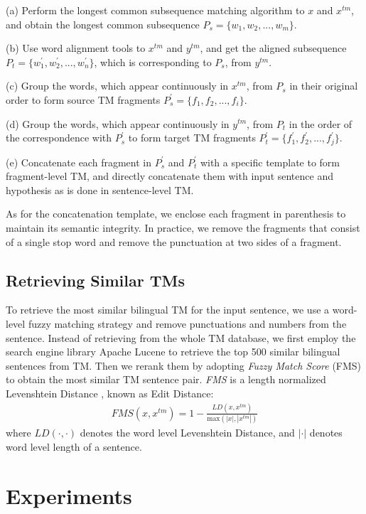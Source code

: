 \documentclass[letterpaper]{article} %
\begin{document}
(a) Perform the longest common subsequence matching algorithm to $x$ and $x^{tm}$, and obtain the longest common subsequence $P_s = \{w_1,w_2,...,w_m\}$.

(b) Use word alignment tools to $x^{tm}$ and $y^{tm}$, and get the aligned subsequence $P_t = \{w^\prime_1,w^\prime_2,...,w^\prime_n\}$, which is corresponding to $P_s$, from $y^{tm}$.

(c) Group the words, which appear continuously in $x^{tm}$, from $P_s$ in their original order to form source TM fragments $P^\prime_s = \{f_1,f_2,...,f_i\}$.

(d) Group the words, which appear continuously in $y^{tm}$, from $P_t$ in the order of the correspondence with $P^\prime_s$ to form target TM fragments $P^\prime_t = \{f^\prime_1,f^\prime_2,...,f^\prime_j\}$.

(e) Concatenate each fragment in $P^\prime_s$ and $P^\prime_t$ with a specific template to form fragment-level TM, and directly concatenate them with input sentence and hypothesis as is done in sentence-level TM.

As for the concatenation template, we enclose each fragment in parenthesis to maintain its semantic integrity. In practice, we remove the fragments that consist of a single stop word and remove the punctuation at two sides of a fragment.

\subsection{Retrieving Similar TMs}

To retrieve the most similar bilingual TM for the input sentence, we use a word-level fuzzy matching strategy and remove punctuations and numbers from the sentence. Instead of retrieving from the whole TM database, we first employ the search engine library Apache Lucene \cite{bialecki2012apache} to retrieve the top 500 similar bilingual sentences from TM. Then we rerank them by adopting \emph{Fuzzy Match Score} (FMS) to obtain the most similar TM sentence pair. \emph{FMS} is a length normalized Levenshtein Distance \cite{yujian2007normalized}, known as Edit Distance:
\begin{eqnarray}
FMS(x,x^{tm})=1-\frac{LD(x,x^{tm})}{\textrm{max}(|x|,|x^{tm}|)}
\end{eqnarray}
where $LD(\cdot,\cdot)$ denotes the word level Levenshtein Distance, and $|\cdot|$ denotes word level length of a sentence.

\section{Experiments}
\end{document}

